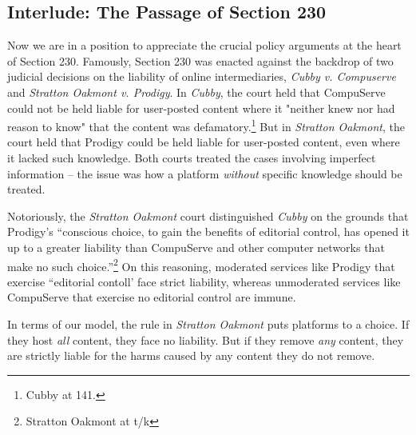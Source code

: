 \subsection{Interlude: The Passage of Section 230}

Now we are in a position to appreciate the crucial policy arguments at the heart of Section 230. Famously, Section 230 was enacted against the backdrop of two judicial decisions on the liability of online intermediaries, \emph{Cubby v. Compuserve} and \emph{Stratton Oakmont v. Prodigy}. In \emph{Cubby}, the court held that CompuServe could not be held liable for user-posted content where it "neither knew nor had reason to know" that the content was defamatory.\footnote{Cubby at 141.} But in \emph{Stratton Oakmont}, the court held that Prodigy could be held liable for user-posted content, even where it lacked such knowledge. Both courts treated the cases involving imperfect information -- the issue was how a platform \emph{without} specific knowledge should be treated.

Notoriously, the \emph{Stratton Oakmont} court distinguished \emph{Cubby} on the grounds that Prodigy's ``conscious choice, to gain the benefits of editorial control, has opened it up to a greater liability than CompuServe and other computer networks that make no such choice.''\footnote{Stratton Oakmont at t/k} On this reasoning, moderated services like Prodigy that exercise ``editorial contoll' face strict liability, whereas unmoderated services like CompuServe that exercise no editorial control are immune.

In terms of our model, the rule in \emph{Stratton Oakmont} puts platforms to a choice. If they host \emph{all} content, they face no liability. But if they remove \emph{any} content, they are strictly liable for the harms caused by any content they do not remove.  

